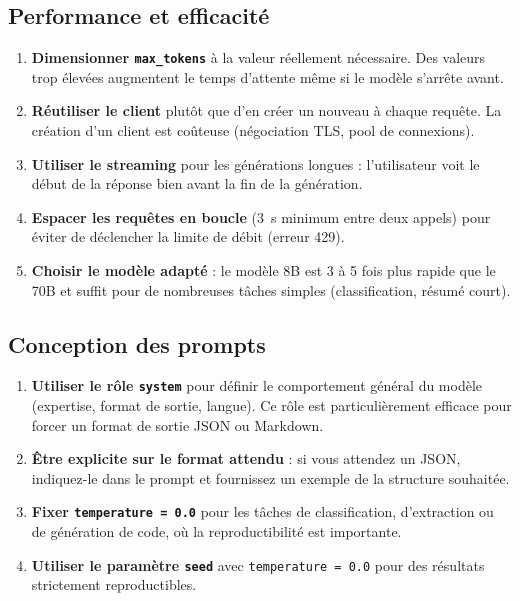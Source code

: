 \documentclass[12pt, a4paper, twoside]{article}
\begin{document}
\subsection{Performance et efficacité}

\begin{enumerate}
  \item \textbf{Dimensionner \texttt{max\_tokens}} à la valeur réellement nécessaire. Des
        valeurs trop élevées augmentent le temps d'attente même si le modèle s'arrête avant.
  \item \textbf{Réutiliser le client} plutôt que d'en créer un nouveau à chaque requête.
        La création d'un client est coûteuse (négociation TLS, pool de connexions).
  \item \textbf{Utiliser le streaming} pour les générations longues : l'utilisateur voit
        le début de la réponse bien avant la fin de la génération.
  \item \textbf{Espacer les requêtes en boucle} (3~s minimum entre deux appels) pour éviter
        de déclencher la limite de débit (erreur 429).
  \item \textbf{Choisir le modèle adapté} : le modèle 8B est 3 à 5 fois plus rapide que
        le 70B et suffit pour de nombreuses tâches simples (classification, résumé court).
\end{enumerate}

\subsection{Conception des prompts}

\begin{enumerate}
  \item \textbf{Utiliser le rôle \texttt{system}} pour définir le comportement général du
        modèle (expertise, format de sortie, langue). Ce rôle est particulièrement efficace
        pour forcer un format de sortie JSON ou Markdown.
  \item \textbf{Être explicite sur le format attendu} : si vous attendez un JSON, indiquez-le
        dans le prompt et fournissez un exemple de la structure souhaitée.
  \item \textbf{Fixer \texttt{temperature = 0.0}} pour les tâches de classification, d'extraction
        ou de génération de code, où la reproductibilité est importante.
  \item \textbf{Utiliser le paramètre \texttt{seed}} avec \texttt{temperature = 0.0} pour
        des résultats strictement reproductibles.
\end{enumerate}
\end{document}
